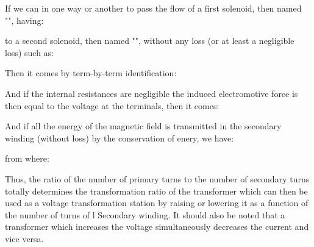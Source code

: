 	If we can in one way or another to pass the flow of a first solenoid, then named "", having:
	
	to a second solenoid, then named "", without any loss (or at least a negligible loss) such as:
	
	Then it comes by term-by-term identification:
	
	And if the internal resistances are negligible the induced electromotive force is then equal to the voltage at the terminals, then it comes:
	
	And if all the energy of the magnetic field is transmitted in the secondary winding (without loss) by the conservation of enery, we have:
	
	from where:
	
	Thus, the ratio of the number of primary turns to the number of secondary turns totally determines the transformation ratio of the transformer which can then be used as a voltage transformation station by raising or lowering it as a function of the number of turns of l Secondary winding. It should also be noted that a transformer which increases the voltage simultaneously decreases the current and vice versa.

